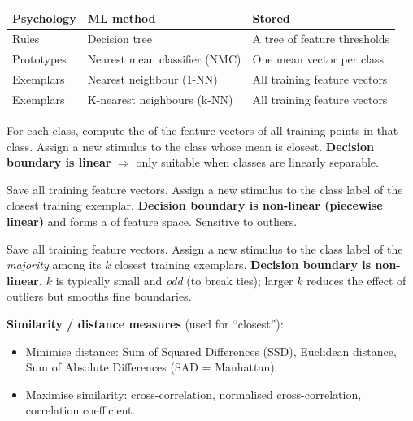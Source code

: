\begin{center}
\renewcommand{\arraystretch}{1.3}
\begin{tabular}{@{} l l l @{}}
\toprule
\textbf{Psychology} & \textbf{ML method} & \textbf{Stored} \\
\midrule
Rules     & Decision tree                 & A tree of feature thresholds \\
Prototypes & Nearest mean classifier (NMC) & One mean vector per class \\
Exemplars  & Nearest neighbour (1-NN)      & All training feature vectors \\
Exemplars  & K-nearest neighbours (k-NN)   & All training feature vectors \\
\bottomrule
\end{tabular}
\end{center}

\begin{defbox}
For each class, compute the  of the feature vectors of all training points in that class. Assign a new stimulus to the class whose mean is closest. \textbf{Decision boundary is linear} $\Rightarrow$ only suitable when classes are linearly separable.
\end{defbox}

\begin{defbox}
Save all training feature vectors. Assign a new stimulus to the class label of the closest training exemplar. \textbf{Decision boundary is non-linear (piecewise linear)} and forms a  of feature space. Sensitive to outliers.
\end{defbox}

\begin{defbox}
Save all training feature vectors. Assign a new stimulus to the class label of the \emph{majority} among its $k$ closest training exemplars. \textbf{Decision boundary is non-linear.} $k$ is typically small and \emph{odd} (to break ties); larger $k$ reduces the effect of outliers but smooths fine boundaries.
\end{defbox}

\textbf{Similarity / distance measures} (used for ``closest''):
\begin{itemize}
  \item Minimise distance: Sum of Squared Differences (SSD), Euclidean distance, Sum of Absolute Differences (SAD = Manhattan).
  \item Maximise similarity: cross-correlation, normalised cross-correlation, correlation coefficient.
\end{itemize}

